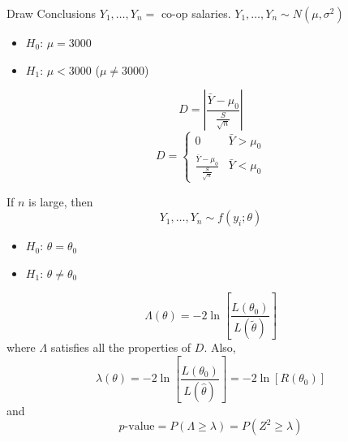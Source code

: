 \begin{Example}{Draw Conclusions}{}
    $ Y_1,\ldots ,Y_n = $ co-op salaries. $ Y_1,\ldots ,Y_n \sim N(\mu,\sigma^2) $
    \begin{itemize}
        \item $ H_0 $: $ \mu=3000 $
        \item $ H_1 $: $ \mu<3000 $ ($ \mu\neq 3000 $)
    \end{itemize}
    \[ D=\left|\frac{\bar{Y}-\mu_0}{\frac{S}{\sqrt{n}}} \right| \]
    \[ D=
        \begin{cases}
            0                                        & \bar{Y}>\mu_0 \\
            \frac{\bar{Y}-\mu_0}{\frac{S}{\sqrt{n}}} & \bar{Y}<\mu_0
        \end{cases} \]
\end{Example}

If $ n $ is large, then
\[ Y_1,\ldots ,Y_n \sim f(y_i;\theta) \]
\begin{itemize}
    \item $ H_0 $: $ \theta=\theta_0 $
    \item $ H_1 $: $ \theta\neq \theta_0 $
\end{itemize}
\[ \Lambda(\theta)=-2\ln\left[ \frac{L(\theta_0)}{L(\tilde{\theta})} \right] \]
where $ \Lambda $ satisfies all the properties of $ D $. Also,
\[ \lambda(\theta)=-2\ln\left[ \frac{L(\theta_0)}{L(\hat{\theta})}\right]
    =-2\ln\left[ R(\theta_0) \right] \]
and
\[ p\text{-value}=P(\Lambda\geqslant \lambda)=P(Z^2\geqslant \lambda) \]
